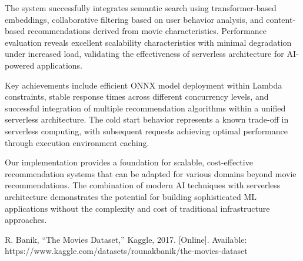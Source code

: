 \documentclass[conference]{IEEEtran}
\begin{document}
The system successfully integrates semantic search using transformer-based embeddings, collaborative filtering based on user behavior analysis, and content-based recommendations derived from movie characteristics. Performance evaluation reveals excellent scalability characteristics with minimal degradation under increased load, validating the effectiveness of serverless architecture for AI-powered applications.

Key achievements include efficient ONNX model deployment within Lambda constraints, stable response times across different concurrency levels, and successful integration of multiple recommendation algorithms within a unified serverless architecture. The cold start behavior represents a known trade-off in serverless computing, with subsequent requests achieving optimal performance through execution environment caching.

Our implementation provides a foundation for scalable, cost-effective recommendation systems that can be adapted for various domains beyond movie recommendations. The combination of modern AI techniques with serverless architecture demonstrates the potential for building sophisticated ML applications without the complexity and cost of traditional infrastructure approaches.

\begin{thebibliography}{9}

R. Banik, ``The Movies Dataset,'' Kaggle, 2017. [Online]. Available: https://www.kaggle.com/datasets/rounakbanik/the-movies-dataset

\end{thebibliography}
\end{document}
